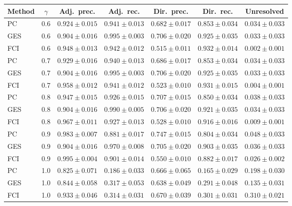 \begin{tabular}{lcccccc}
\toprule
Method & $\gamma$ & Adj.\ prec. & Adj.\ rec. & Dir.\ prec. & Dir.\ rec. & Unresolved \\
\midrule
PC & 0.6 & $0.924\pm0.015$ & $0.941\pm0.013$ & $0.682\pm0.017$ & $0.853\pm0.034$ & $0.034\pm0.033$ \\
GES & 0.6 & $0.904\pm0.016$ & $0.995\pm0.003$ & $0.706\pm0.020$ & $0.925\pm0.035$ & $0.033\pm0.033$ \\
FCI & 0.6 & $0.948\pm0.013$ & $0.942\pm0.012$ & $0.515\pm0.011$ & $0.932\pm0.014$ & $0.002\pm0.001$ \\
PC & 0.7 & $0.929\pm0.016$ & $0.940\pm0.013$ & $0.686\pm0.017$ & $0.853\pm0.034$ & $0.034\pm0.033$ \\
GES & 0.7 & $0.904\pm0.016$ & $0.995\pm0.003$ & $0.706\pm0.020$ & $0.925\pm0.035$ & $0.033\pm0.033$ \\
FCI & 0.7 & $0.958\pm0.012$ & $0.941\pm0.012$ & $0.523\pm0.010$ & $0.931\pm0.015$ & $0.004\pm0.001$ \\
PC & 0.8 & $0.947\pm0.015$ & $0.926\pm0.015$ & $0.707\pm0.015$ & $0.850\pm0.034$ & $0.038\pm0.033$ \\
GES & 0.8 & $0.904\pm0.016$ & $0.990\pm0.005$ & $0.706\pm0.020$ & $0.921\pm0.035$ & $0.034\pm0.033$ \\
FCI & 0.8 & $0.967\pm0.011$ & $0.927\pm0.013$ & $0.528\pm0.010$ & $0.916\pm0.016$ & $0.009\pm0.001$ \\
PC & 0.9 & $0.983\pm0.007$ & $0.881\pm0.017$ & $0.747\pm0.015$ & $0.804\pm0.034$ & $0.048\pm0.033$ \\
GES & 0.9 & $0.904\pm0.016$ & $0.970\pm0.008$ & $0.705\pm0.020$ & $0.903\pm0.035$ & $0.036\pm0.033$ \\
FCI & 0.9 & $0.995\pm0.004$ & $0.901\pm0.014$ & $0.550\pm0.010$ & $0.882\pm0.017$ & $0.026\pm0.002$ \\
PC & 1.0 & $0.825\pm0.071$ & $0.186\pm0.033$ & $0.666\pm0.065$ & $0.165\pm0.029$ & $0.198\pm0.030$ \\
GES & 1.0 & $0.844\pm0.058$ & $0.317\pm0.053$ & $0.638\pm0.049$ & $0.291\pm0.048$ & $0.135\pm0.031$ \\
FCI & 1.0 & $0.933\pm0.046$ & $0.314\pm0.031$ & $0.670\pm0.039$ & $0.301\pm0.031$ & $0.310\pm0.021$ \\
\bottomrule
\end{tabular}

